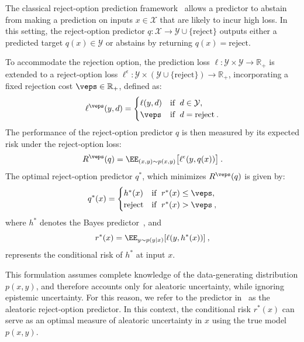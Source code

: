 The classical reject-option prediction framework~\cite{Chow-RejectOpt-TIT1970} allows a predictor to abstain from making a prediction on inputs $x \in \mathcal{X}$ that are likely to incur high loss. In this setting, the reject-option predictor $q: \mathcal{X} \rightarrow \mathcal{Y} \cup \{ \text{reject} \}$ outputs either a predicted target $q(x) \in \mathcal{Y}$ or abstains by returning $q(x) = \text{reject}$.

To accommodate the rejection option, the prediction loss $\ell \colon \mathcal{Y} \times \mathcal{Y} \rightarrow \mathbb{R}_+$ is extended to a reject-option loss $\ell^\epsilon: \mathcal{Y} \times (\mathcal{Y} \cup \{\text{reject}\}) \rightarrow \mathbb{R}_+$, incorporating a fixed rejection cost $\veps \in \mathbb{R}_+$, defined as:
%
\begin{align}
\label{equ:rejectOptLoss}
\ell^\veps(y,d) = 
\begin{cases}
\ell(y,d) & \text{if }\; d\in\mathcal{Y},\\
\veps & \text{if }\; d = \text{reject}\:.
\end{cases}
\end{align}
%
The performance of the reject-option predictor $q$ is then measured by its expected risk under the reject-option loss:
\begin{equation}
  \label{equ:ExpRiskRejectOption}
   R^\veps(q) = \EE_{(x,y)\sim p(x,y)}\big [ \ell^\epsilon(y,q(x)) \big ] \:.
\end{equation}
%
The optimal reject-option predictor $q^*$, which minimizes $R^\veps(q)$ is given by:
\begin{equation}
\label{equ:BayesOptimalPred}
   q^*(x) = \begin{cases}
   h^*(x) & \text{if }\; r^*(x)\leq \veps,\\
     \text{reject} & \text{if }\; r^*(x) > \veps\:,   
    \end{cases}
\end{equation}
%
where $h^*$ denotes the Bayes predictor~, and 
\begin{equation}
\label{equ:condRisk}
   r^*(x) = \EE_{y\sim p(y|x)}[\ell(y,h^*(x))] \:,
\end{equation}
%
represents the conditional risk of $h^*$ at input $x$.

This formulation assumes complete knowledge of the data-generating distribution $p(x, y)$, and therefore accounts only for aleatoric uncertainty, while ignoring epistemic uncertainty. For this reason, we refer to the predictor in~ as the aleatoric reject-option predictor. In this context, the conditional risk $r^*(x)$ can serve as an optimal measure of aleatoric uncertainty in $x$ using the true model $p(x,y)$.

